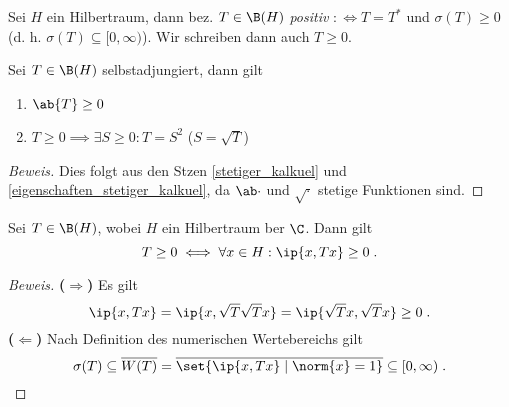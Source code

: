 	\begin{definition}
		Sei $H$ ein Hilbertraum, dann bez. \(T\in\B(H)\) \textit{positiv} \(:\iff T = T^*\) und \(\sigma(T) \geq 0\) (d. h. \(\sigma(T) \subseteq [0,\infty)\)). Wir schreiben dann auch \(T \geq 0\).
	\end{definition}
	
	\begin{theorem}
		Sei \(T\in\B(H)\) selbstadjungiert, dann gilt
		\begin{enumerate}
			\item \(\ab{T} \geq 0\)
			\item \(T\geq 0 \implies \exists S \geq 0: T = S^2\) ($S = \sqrt{T}$)
		\end{enumerate}
		\begin{proof}[Beweis]
			Dies folgt aus den S\as tzen \ref{stetiger_kalkuel} und \ref{eigenschaften_stetiger_kalkuel}, da \(\ab\cdot\) und \(\sqrt\cdot\) stetige Funktionen sind.
		\end{proof}
	\end{theorem}
	
	\begin{theorem}
		Sei \(T\in \B(H)\), wobei $H$ ein Hilbertraum \us ber $\C$. Dann gilt
		\[T \geq 0 \iff \forall x \in H: \ip{x,Tx} \geq 0 \;.\]
	\end{theorem}
	\begin{proof}[Beweis]
		\textbf{($\Longrightarrow$)} Es gilt
		\[\ip{x,Tx} = \ip{x,\sqrt{T}\sqrt{T} x} = \ip{\sqrt{T}x, \sqrt{T}x} \geq 0\;.\]
		\textbf{($\Longleftarrow$)}
		Nach Definition des numerischen Wertebereichs gilt
		\[\sigma(T) \subseteq \overline{W(T)} = \overline{\set{\ip{x, Tx}\;\vert\;\norm{x} = 1}} \subseteq [0,\infty)\;.\]
	\end{proof}